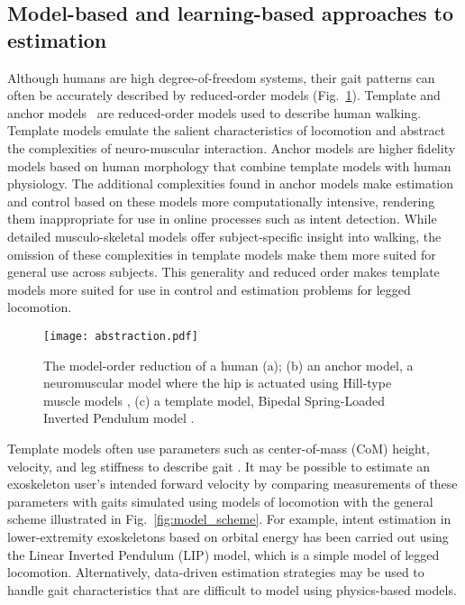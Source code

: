 \subsection{Model-based and learning-based approaches to estimation}\label{sec:model_v_learning}
Although humans are high degree-of-freedom systems, their gait patterns can often be accurately described by reduced-order models (Fig.~\ref{fig:abstraction}). Template and anchor models~\cite{full1999templates} are reduced-order models used to describe human walking. Template models emulate the salient characteristics of locomotion and abstract the complexities of neuro-muscular interaction. Anchor models are higher fidelity models based on human morphology that combine template models with human physiology. The additional complexities found in anchor models make estimation and control based on these models more computationally intensive, rendering them inappropriate for use in online processes such as intent detection. While detailed musculo-skeletal models offer subject-specific insight into walking, the omission of these complexities in template models make them more suited for general use across subjects. This generality and reduced order makes template models more suited for use in control and estimation problems for legged locomotion.

\begin{figure}
	\centering
	\texttt{[image: abstraction.pdf]}
	\caption[The model-order reduction of (a) a human; (b) an anchor model, a neuromuscular model where the hip is actuated using Hill-type muscle models, (c) a template model, Bipedal Spring-Loaded Inverted Pendulum model]{The model-order reduction of a human (a); (b) an anchor model, a neuromuscular model where the hip is actuated using Hill-type muscle models \cite{davoodi2019template}, (c) a template model, Bipedal Spring-Loaded Inverted Pendulum model \cite{geyer2006compliant}. }\label{fig:abstraction}
\end{figure}


Template models often use parameters such as center-of-mass (CoM) height, velocity, and leg stiffness to describe gait \cite{geyer2006compliant,liu2015dynamic,full1999templates,sharbafi2015fmch}. It may be possible to estimate an exoskeleton user's intended forward velocity by comparing measurements of these parameters with gaits simulated using models of locomotion with the general scheme illustrated in Fig.~\ref{fig:model_scheme}. For example, intent estimation in lower-extremity exoskeletons based on orbital energy \cite{chen2018dynamic} has been carried out using the Linear Inverted Pendulum (LIP) model, which is a simple model of legged locomotion.  Alternatively, data-driven estimation strategies \cite{ge2011neural, kalinowska2019data, joukov2017rhythmic} may be used to handle gait characteristics that are difficult to model using physics-based models.
%

